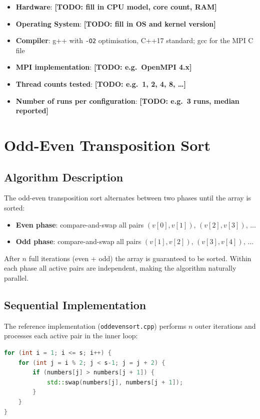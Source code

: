 \documentclass[11pt,a4paper]{article}
\begin{document}
\begin{itemize}
    \item \textbf{Hardware}: \textbf{[TODO: fill in CPU model, core count, RAM]}
    \item \textbf{Operating System}: \textbf{[TODO: fill in OS and kernel version]}
    \item \textbf{Compiler}: g++ with \texttt{-O2} optimisation, C++17 standard; gcc for the MPI C file
    \item \textbf{MPI implementation}: \textbf{[TODO: e.g.\ OpenMPI 4.x]}
    \item \textbf{Thread counts tested}: \textbf{[TODO: e.g.\ 1, 2, 4, 8, \ldots]}
    \item \textbf{Number of runs per configuration}: \textbf{[TODO: e.g.\ 3 runs, median reported]}
\end{itemize}

\section{Odd-Even Transposition Sort}

\subsection{Algorithm Description}

The odd-even transposition sort alternates between two phases until the array is sorted:

\begin{itemize}
    \item \textbf{Even phase}: compare-and-swap all pairs $(v[0],v[1]),\,(v[2],v[3]),\,\ldots$
    \item \textbf{Odd phase}: compare-and-swap all pairs $(v[1],v[2]),\,(v[3],v[4]),\,\ldots$
\end{itemize}

After $n$ full iterations (even + odd) the array is guaranteed to be sorted.
Within each phase all active pairs are independent, making the algorithm naturally parallel.

\subsection{Sequential Implementation}

The reference implementation (\texttt{oddevensort.cpp}) performs $n$ outer iterations and
processes each active pair in the inner loop:

\begin{lstlisting}[language=C++, caption=Sequential Odd-Even Sort (core loop)]
for (int i = 1; i <= s; i++) {
    for (int j = i % 2; j < s-1; j = j + 2) {
        if (numbers[j] > numbers[j + 1]) {
            std::swap(numbers[j], numbers[j + 1]);
        }
    }
}
\end{lstlisting}
\end{document}
